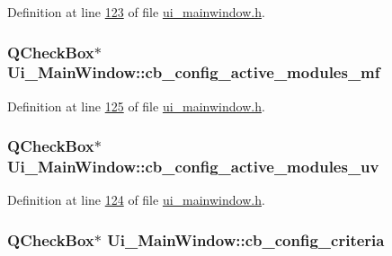 Definition at line \hyperlink{a00139_source_l00123}{123} of file \hyperlink{a00139_source}{ui\+\_\+mainwindow.\+h}.

\hypertarget{a00080_abc96d02b5b7a9480a2a142008e99a100}{
\subsubsection[{cb\+\_\+config\+\_\+active\+\_\+modules\+\_\+mf}]{\setlength{\rightskip}{0pt plus 5cm}Q\+Check\+Box$\ast$ Ui\+\_\+\+Main\+Window\+::cb\+\_\+config\+\_\+active\+\_\+modules\+\_\+mf}}\label{a00080_abc96d02b5b7a9480a2a142008e99a100}


Definition at line \hyperlink{a00139_source_l00125}{125} of file \hyperlink{a00139_source}{ui\+\_\+mainwindow.\+h}.

\hypertarget{a00080_a72ad8a6b100948f9b1438cf3b949be5e}{
\subsubsection[{cb\+\_\+config\+\_\+active\+\_\+modules\+\_\+uv}]{\setlength{\rightskip}{0pt plus 5cm}Q\+Check\+Box$\ast$ Ui\+\_\+\+Main\+Window\+::cb\+\_\+config\+\_\+active\+\_\+modules\+\_\+uv}}\label{a00080_a72ad8a6b100948f9b1438cf3b949be5e}


Definition at line \hyperlink{a00139_source_l00124}{124} of file \hyperlink{a00139_source}{ui\+\_\+mainwindow.\+h}.

\hypertarget{a00080_a89574c631636929702a5928b2a159892}{
\subsubsection[{cb\+\_\+config\+\_\+criteria}]{\setlength{\rightskip}{0pt plus 5cm}Q\+Check\+Box$\ast$ Ui\+\_\+\+Main\+Window\+::cb\+\_\+config\+\_\+criteria}}\label{a00080_a89574c631636929702a5928b2a159892}


